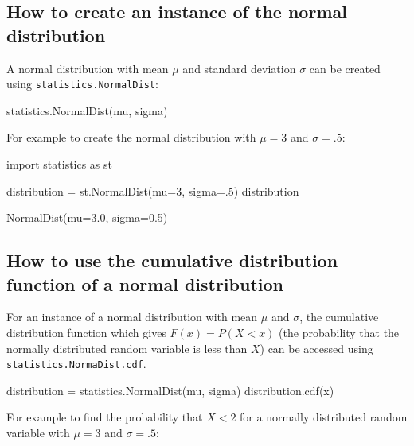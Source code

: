 \subsection{How to create an instance of the normal distribution}
\label{\detokenize{tools-for-mathematics/08-statistics/how/main:how-to-create-an-instance-of-the-normal-distribution}}

A normal distribution with mean \(\mu\) and standard deviation \(\sigma\) can be
created using \texttt{statistics.NormalDist}:


\begin{api}
statistics.NormalDist(mu, sigma)
\end{api}



For example to create the normal distribution with \(\mu=3\) and \(\sigma=.5\):




\begin{pyin}
import statistics as st

distribution = st.NormalDist(mu=3, sigma=.5)
distribution
\end{pyin}





\begin{raw}
NormalDist(mu=3.0, sigma=0.5)
\end{raw}





\subsection{How to use the cumulative distribution function of a normal distribution}
\label{\detokenize{tools-for-mathematics/08-statistics/how/main:how-to-use-the-cumulative-distribution-function-of-a-normal-distribution}}

For an instance of a normal distribution with mean \(\mu\) and \(\sigma\), the
cumulative distribution function which gives \(F(x)=P(X<x)\) (the probability that
the normally distributed random variable is less than \(X\)) can be accessed using
\texttt{statistics.NormaDist.cdf}.


\begin{api}
distribution = statistics.NormalDist(mu, sigma)
distribution.cdf(x)
\end{api}



For example to find the probability that \(X<2\) for a normally distributed random
variable with \(\mu=3\) and \(\sigma=.5\):




